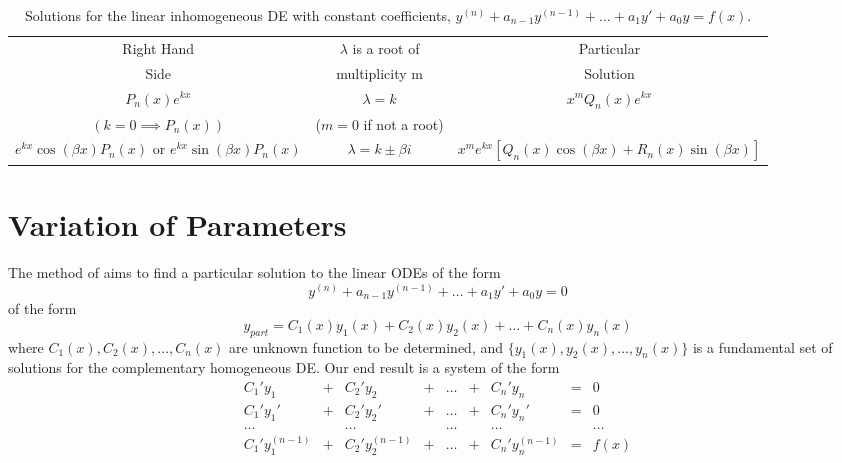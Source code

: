 \documentclass[12pt, a4paper, oneside, openright, titlepage]{book}
\begin{document}
\bgroup
\def\arraystretch{1.5}
\begin{table}[H]
        \centering
        \caption{Solutions for the linear inhomogeneous DE with constant coefficients, $y^{(n)}+a_{n-1}y^{(n-1)}+\hdots+a_1y'+a_0y = f(x)$.}
        \begin{adjustwidth}{-0.7cm}{}
                \begin{tabular}{c|c|c}
                        Right Hand & $\lambda$ is a root of & Particular \\
                        Side & multiplicity m & Solution \\ \hline
                        $P_n(x)e^{kx}$ & $\lambda = k$ & $x^mQ_n(x)e^{kx}$ \\
                        $(k=0 \implies P_n(x))$ & ($m = 0$ if not a root) & \\
                        $e^{kx}\cos(\beta x)P_n(x)$ or $e^{kx}\sin(\beta x)P_n(x)$ & $\lambda = k \pm \beta i$ & $x^me^{kx}[Q_n(x)\cos(\beta x) + R_n(x)\sin(\beta x)]$ \\
                \end{tabular}
        \end{adjustwidth}
\end{table}
\egroup


\section{Variation of Parameters}

\begin{defn}
        The method of  aims to find a particular solution to the linear ODEs of the form \begin{equation}
                y^{(n)}+a_{n-1}y^{(n-1)}+\hdots+a_1y'+a_0y = 0
        \end{equation} 
        of the form \begin{equation}
                y_{part} = C_1(x)y_1(x) + C_2(x)y_2(x)+...+C_n(x)y_n(x)
        \end{equation}
        where $C_1(x), C_2(x), ..., C_n(x)$ are unknown function to be determined, and $\{y_1(x), y_2(x),...,y_n(x)\}$ is a fundamental set of solutions for the complementary homogeneous DE. Our end result is a system of the form \begin{equation}
                \begin{matrix}
                        C_1'y_1& +& C_2'y_2&+&\hdots&+&C_n'y_n& =& 0 \\
                        C_1'y_1'& +& C_2'y_2'&+&\hdots&+&C_n'y_n' &=& 0 \\
                        \hdots&&\hdots&&\hdots&&\hdots&&\hdots \\
                        C_1'y_1^{(n-1)}& + &C_2'y_2^{(n-1)}&+&\hdots&+&C_n'y_n^{(n-1)} &=& f(x)
                \end{matrix}
        \end{equation}
\end{defn}
\end{document}
